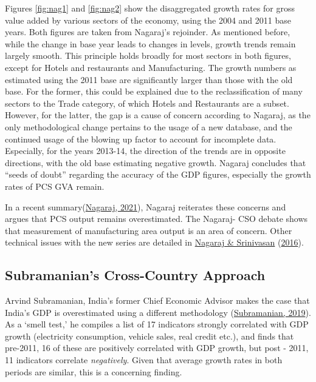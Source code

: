 \documentclass[12pt,nobind, a4paper]{reedthesis}
\begin{document}
 Figures \ref{fig:nag1} and \ref{fig:nag2} show the disaggregated growth rates for gross value added by various sectors of the economy, using the 2004 and 2011 base years. Both figures are taken from Nagaraj's rejoinder. As mentioned before, while the change in base year leads to changes in levels, growth trends remain largely smooth. This principle holds broadly for most sectors in both figures, except for Hotels and restaurants and Manufacturing. The growth numbers as estimated using the 2011 base are significantly larger than those with the old base. For the former, this could be explained due to the reclassification of many sectors to the Trade category, of which Hotels and Restaurants are a subset. However, for the latter, the gap is a cause of concern according to Nagaraj, as the only methodological change pertains to the usage of a new database, and the continued usage of the blowing up factor to account for incomplete data. Especially, for the years 2013-14, the direction of the trends are in opposite directions, with the old base estimating negative growth. Nagaraj concludes that ``seeds of doubt'' regarding the accuracy of the GDP figures, especially the growth rates of PCS GVA remain.
 \linebreak

 In a recent summary(\protect\hyperlink{ref-nagaraj_revisiting_2021}{Nagaraj, 2021}), Nagaraj reiterates these concerns and argues that PCS output remains overestimated. The Nagaraj- CSO debate shows that measurement of manufacturing area output is an area of concern. Other technical issues with the new series are detailed in \protect\hyperlink{ref-nagaraj_measuring_2016}{Nagaraj \& Srinivasan} (\protect\hyperlink{ref-nagaraj_measuring_2016}{2016}).

 \hypertarget{subramanians-cross-country-approach}{%
 \subsection{Subramanian's Cross-Country Approach}\label{subramanians-cross-country-approach}}

 Arvind Subramanian, India's former Chief Economic Advisor makes the case that India's GDP is overestimated using a different methodology (\protect\hyperlink{ref-subramanian_indias_2019}{Subramanian, 2019}). As a `smell test,' he compiles a list of 17 indicators strongly correlated with GDP growth (electricity consumption, vehicle sales, real credit etc.), and finds that pre-2011, 16 of these are positively correlated with GDP growth, but post - 2011, 11 indicators correlate \emph{negatively}. Given that average growth rates in both periods are similar, this is a concerning finding.
 \linebreak
\end{document}
